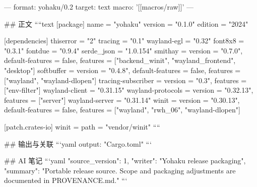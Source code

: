 ---
format: yohaku/0.2
target: text
macro: '[[macros/raw]]'
---

## 正文
````text
[package]
name = "yohaku"
version = "0.1.0"
edition = "2024"

[dependencies]
thiserror = "2"
tracing = "0.1"
wayland-egl = "0.32"
font8x8 = "0.3.1"
fontdue = "0.9.4"
serde_json = "1.0.154"
smithay = { version = "0.7.0", default-features = false, features = ["backend_winit", "wayland_frontend", "desktop"] }
softbuffer = { version = "0.4.8", default-features = false, features = ["wayland", "wayland-dlopen"] }
tracing-subscriber = { version = "0.3", features = ["env-filter"] }
wayland-client = "0.31.15"
wayland-protocols = { version = "0.32.13", features = ["server"] }
wayland-server = "0.31.14"
winit = { version = "0.30.13", default-features = false, features = ["wayland", "rwh_06", "wayland-dlopen"] }

[patch.crates-io]
winit = { path = "vendor/winit" }
````

## 输出与关联
```yaml
output: "Cargo.toml"
```

## AI 笔记
```yaml
{"source_version": 1, "writer": "Yohaku release packaging", "summary": "Portable release source. Scope and packaging adjustments are documented in PROVENANCE.md."}
```
